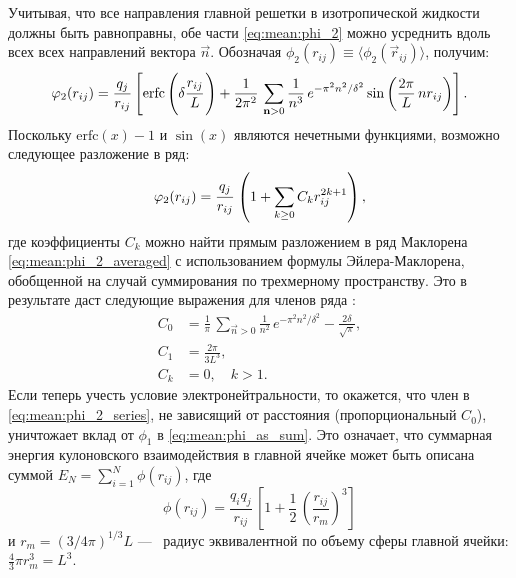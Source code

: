 Учитывая, что все направления главной решетки в изотропической жидкости должны быть равноправны, обе части \eqref{eq:mean:phi_2} можно усреднить вдоль всех всех направлений вектора $\vec{n}$.
Обозначая $\phi_2 (r_{ij}) \equiv \langle \phi_2 (\vec{r}_{ij}) \rangle$, получим:
\begin{equation}
    \label{eq:mean:phi_2_averaged}
    \phi_2 (r_{ij}) = \frac{q_{j}}{r_{ij}} \left[ \mathrm{erfc} \left( \delta \cfrac{r_{ij}}{L}\, \right) + \frac{1}{2\pi^2}\, \sum\limits_{\vec{n} > 0}^{} \frac{1}{n^3}\, e^{-\pi^2 n^2 / \delta^2} \sin \left( \frac{2\pi}{L}\, n r_{ij} \right) \right].
\end{equation}
Поскольку $\mathrm{erfc}(x) - 1$ и $\sin (x)$ являются нечетными функциями, возможно следующее разложение в ряд:
\begin{equation}
    \label{eq:mean:phi_2_series}
    \phi_2 (r_{ij}) = \cfrac{q_{j}}{r_{ij}}\, \left( 1 + \sum\limits_{k \geq 0}^{} C_{k} r_{ij}^{2k+1} \right),
\end{equation}
где коэффициенты $C_k$ можно найти прямым разложением в ряд Маклорена \eqref{eq:mean:phi_2_averaged} с использованием формулы Эйлера-Маклорена, обобщенной на случай суммирования по трехмерному пространству.
Это в результате даст следующие выражения для членов ряда \cite{jel:pre-averaged_summation}:
\begin{equation}
    \label{eq:mean:C_coeffs}
    \begin{aligned}
        C_0 &= \frac{1}{\pi}\, \sum\limits_{\vec{n} > 0}^{} \frac{1}{n^2}\, e^{-\pi^2 n^2 / \delta^2} - \frac{2\delta}{\sqrt{\pi}}, \\
        C_1 &= \frac{2\pi}{3 L^3}, \\
        C_k &= 0, \quad k > 1.
    \end{aligned}
\end{equation}
Если теперь учесть условие электронейтральности, то окажется, что член в \eqref{eq:mean:phi_2_series}, не зависящий от расстояния (пропорциональный $C_0$), уничтожает вклад от $\phi_1$ в \eqref{eq:mean:phi_as_sum}.
Это означает, что суммарная энергия кулоновского взаимодействия в главной ячейке может быть описана суммой $E_N = \sum_{i=1}^N \phi (r_{ij})$, где
\begin{equation}
    \label{eq:mean:phi_final}
    \phi (r_{ij}) = \frac{q_i q_j}{r_{ij}}\, \left[ 1 + \frac{1}{2}\, \left( \frac{r_{ij}}{r_{m}} \right)^3 \right]
\end{equation}
и $r_{m} = (3 / 4 \pi)^{1 / 3} L$ ---~ радиус эквивалентной по объему сферы главной ячейки: $\frac{4}{3} \pi r_{m}^3 = L^3$.

